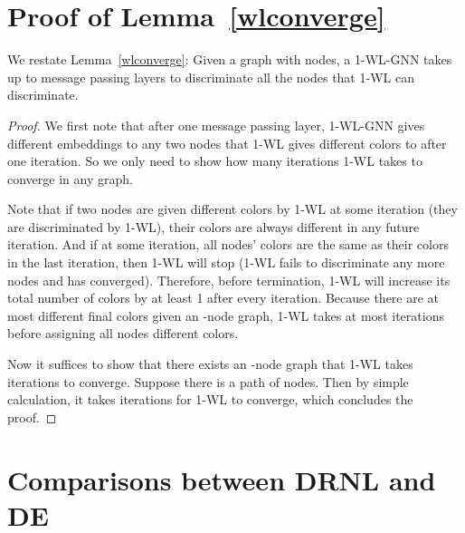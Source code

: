 \documentclass{article}
\begin{document}
\section{Proof of Lemma~\ref{wlconverge}}
We restate Lemma~\ref{wlconverge}: Given a graph with  nodes, a 1-WL-GNN takes up to  message passing layers to discriminate all the nodes that 1-WL can discriminate.

\begin{proof}
We first note that after one message passing layer, 1-WL-GNN gives different embeddings to any two nodes that 1-WL gives different colors to after one iteration. So we only need to show how many iterations 1-WL takes to converge in any graph.

Note that if two nodes are given different colors by 1-WL at some iteration (they are discriminated by 1-WL), their colors are always different in any future iteration. And if at some iteration, all nodes' colors are the same as their colors in the last iteration, then 1-WL will stop (1-WL fails to discriminate any more nodes and has converged). Therefore, before termination, 1-WL will increase its total number of colors by at least 1 after every iteration. Because there are at most  different final colors given an -node graph, 1-WL takes at most  iterations before assigning all nodes different colors.

Now it suffices to show that there exists an -node graph that 1-WL takes  iterations to converge. Suppose there is a path of  nodes. Then by simple calculation, it takes  iterations for 1-WL to converge, which concludes the proof.
\end{proof}










































\section{Comparisons between DRNL and DE}\label{drnlde}
\end{document}
